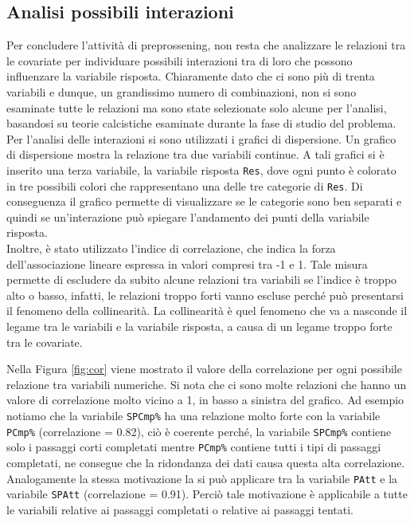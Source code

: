 \subsection{Analisi possibili interazioni} 
Per concludere l'attività di preprossening, non resta che analizzare le relazioni tra le covariate per individuare possibili interazioni tra di loro che possono influenzare la variabile risposta. Chiaramente dato che ci sono più di trenta variabili e dunque, un grandissimo numero di combinazioni, non si sono esaminate tutte le relazioni ma sono state selezionate solo alcune per l'analisi, basandosi su teorie calcistiche esaminate durante la fase di studio del problema.\\


Per l'analisi delle interazioni si sono utilizzati i grafici di dispersione. Un grafico di dispersione mostra la relazione tra due variabili continue. A tali grafici si è inserito una terza variabile, la variabile risposta \texttt{Res}, dove ogni punto è colorato in tre possibili colori che rappresentano una delle tre categorie di \texttt{Res}. Di conseguenza il grafico permette di visualizzare se le categorie sono ben separati e quindi se un'interazione può spiegare l'andamento dei punti della variabile risposta.\\
Inoltre, è stato utilizzato l'indice di correlazione, che indica la forza dell'associazione lineare espressa in valori compresi tra -1 e 1. Tale misura permette di escludere da subito alcune relazioni tra variabili se l'indice è troppo alto o basso, infatti, le relazioni troppo forti vanno escluse perché può presentarsi il fenomeno della collinearità. 
La collinearità è quel fenomeno che va a nasconde il legame tra le variabili e la variabile risposta, a causa di un legame troppo forte tra le covariate.

Nella Figura \ref{fig:cor} viene mostrato il valore della correlazione per ogni possibile relazione tra variabili numeriche. Si nota che ci sono molte relazioni che hanno un valore di correlazione molto vicino a 1, in basso a sinistra del grafico. Ad esempio notiamo che la variabile \texttt{SPCmp\%} ha una relazione molto forte con la variabile \texttt{PCmp\%} (correlazione = 0.82), ciò è coerente perché, la variabile \texttt{SPCmp\%} contiene solo i passaggi corti completati mentre \texttt{PCmp\%} contiene tutti i tipi di passaggi completati, ne consegue che la ridondanza dei dati causa questa alta correlazione. Analogamente la stessa motivazione la si può applicare tra la variabile \texttt{PAtt} e la variabile \texttt{SPAtt} (correlazione = 0.91). Perciò tale motivazione è applicabile a tutte le variabili relative ai passaggi completati o relative ai passaggi tentati.

